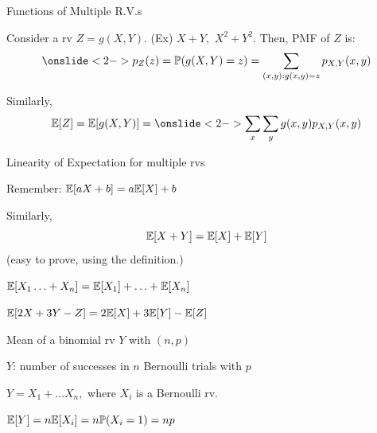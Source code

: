 \documentclass[fleqn,aspectratio=169]{beamer}
\begin{document}
\begin{frame}{Functions of Multiple R.V.s}

\plitemsep 0.1in
\bci

\item<1-> Consider a rv $Z = g(X,Y).$ (Ex) $X+Y,$ $X^2 + Y^2.$  Then, PMF of $Z$ is:
$$
\onslide<2->{\pz = \cprob{g(X,Y) = z} = \sum_{(x,y): g(x,y) = z} \pxy}
$$

\item Similarly, 
$$
\expect{Z} = \expect{g(X,Y)} = \onslide<2->{\sum_{x} \sum_{y} g(x,y) \pxy}
$$


\eci 
\end{frame}


\begin{frame}{Linearity of Expectation for multiple rvs }


{
\plitemsep 0.15in
\bci 

\item Remember: $\mathbb{E}[ aX + b ] = a\mathbb{E}[ X ] +b$

\item<2-> Similarly, 
$$\mathbb{E}[ X+Y ] = \mathbb{E}[ X ] + \mathbb{E}[ Y ]$$ 
(easy to prove, using the definition.)

\bigskip

\bigskip

\item<3-> $\mathbb{E}[ X_1 \ldots + X_n ] = \mathbb{E}[ X_1 ] + \ldots + \mathbb{E}[ X_n ]$

\item<3-> $\mathbb{E}[ 2X + 3Y - Z ] = 2\mathbb{E}[ X ] + 3 \mathbb{E}[ Y ] - \mathbb{E}[ Z ]$
\eci 
}
{
\plitemsep 0.15in
\bci 

\item<4->  Mean of a binomial rv $Y$ with $(n,p)$

\item<4-> $Y$: number of successes in $n$ Bernoulli trials with $p$

\item<5-> $Y = X_1 + \ldots X_n,$ where $X_i$ is a Bernoulli rv. 

\item<5-> $\mathbb{E}[ Y ] = n \mathbb{E}[ X_i ] = n \mathbb{P}( X_i = 1 ) = np$

\eci 

}
\end{frame}
\end{document}
